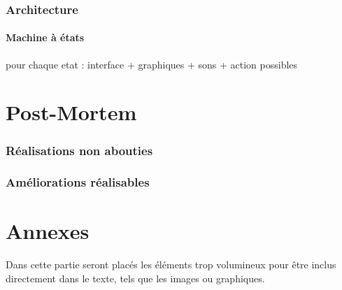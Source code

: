 \documentclass[a4paper]{article}
\newcommand{\alinea}{\hspace*{0.5cm}}
\begin{document}
	\section{Architecture}
	
		\subsection{Machine à états}
			pour chaque etat :
			interface + graphiques + sons + action possibles
	

  \newpage
  \part{Post-Mortem}
  
	\section{Réalisations non abouties}
	
	\section{Améliorations réalisables}
	

  \newpage
  \part{Annexes}
    \alinea Dans cette partie seront placés les éléments trop volumineux pour être inclus directement dans le texte, tels que les images ou graphiques.\\
    
\end{document}
